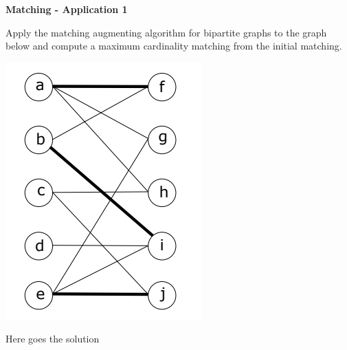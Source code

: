 \question \textbf{Matching - Application 1}

Apply the matching augmenting algorithm for bipartite graphs to the graph below and compute a maximum cardinality matching from the initial matching.

\includegraphics[width=0.2\linewidth]{task_02/assignment11_task2.png}

\begin{solution}
Here goes the solution
\end{solution}